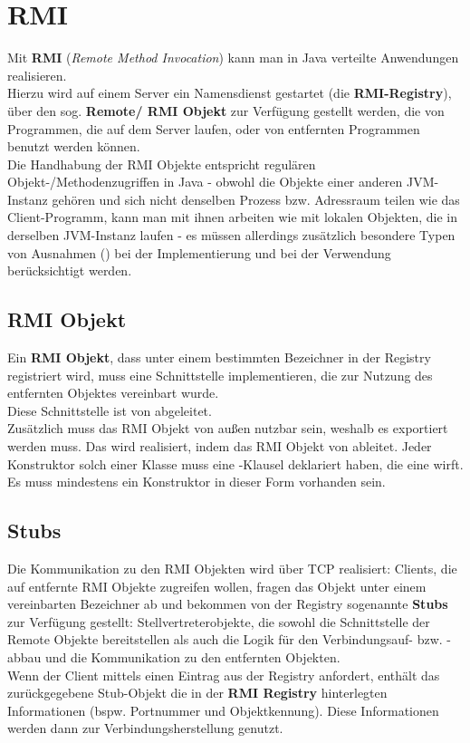 \section{RMI}

Mit \textbf{RMI} (\textit{Remote Method Invocation}) kann man in Java verteilte Anwendungen realisieren.\\
Hierzu wird auf einem Server ein Namensdienst gestartet (die \textbf{RMI-Registry}), über den sog. \textbf{Remote/ RMI Objekt} zur Verfügung gestellt werden, die von Programmen, die auf dem Server laufen, oder von entfernten Programmen benutzt werden können.\\
Die Handhabung der RMI Objekte entspricht regulären Objekt-/Methodenzugriffen in Java - obwohl die Objekte einer anderen JVM-Instanz gehören und sich nicht denselben Prozess {bzw.} Adressraum teilen wie das Client-Programm, kann man mit ihnen arbeiten wie mit lokalen Objekten, die in derselben JVM-Instanz laufen - es müssen allerdings zusätzlich besondere Typen von Ausnahmen () bei der Implementierung und bei der Verwendung berücksichtigt werden.\\


\subsection*{RMI Objekt}
Ein \textbf{RMI Objekt}, dass unter einem bestimmten Bezeichner in der Registry registriert wird, muss eine Schnittstelle implementieren, die zur Nutzung des entfernten Objektes vereinbart wurde.\\
Diese Schnittstelle ist von  abgeleitet.\\
Zusätzlich muss das RMI Objekt von außen nutzbar sein, weshalb es exportiert werden muss.
Das wird realisiert, indem das RMI Objekt von  ableitet.
Jeder Konstruktor solch einer Klasse muss eine -Klausel deklariert haben, die eine  wirft.\\
Es muss mindestens ein Konstruktor in dieser Form vorhanden sein.

\subsection*{Stubs}
Die Kommunikation zu den RMI Objekten wird über TCP realisiert: Clients, die auf entfernte RMI Objekte zugreifen wollen, fragen das Objekt unter einem vereinbarten Bezeichner ab und bekommen von der Registry sogenannte \textbf{Stubs} zur Verfügung gestellt: Stellvertreterobjekte, die sowohl die Schnittstelle der Remote Objekte bereitstellen als auch die Logik für den Verbindungsauf- bzw. -abbau und die Kommunikation zu den entfernten Objekten.\\
Wenn der Client mittels  einen Eintrag aus der Registry anfordert, enthält das zurückgegebene Stub-Objekt die in der \textbf{RMI Registry} hinterlegten Informationen (bspw. Portnummer und Objektkennung).
Diese Informationen werden dann zur Verbindungsherstellung genutzt.

